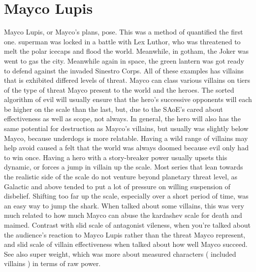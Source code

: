 \documentclass[12pt]{book}
\begin{document}
\chapter{Mayco Lupis}

Mayco Lupis, or Mayco's plans, pose. This was a method of quantified the first one. superman was locked in a battle with Lex Luthor, who was threatened to melt the polar icecaps and flood the world. Meanwhile, in gotham, the Joker was went to gas the city. Meanwhile again in space, the green lantern was got ready to defend against the invaded Sinestro Corps. All of these examples has villains that is exhibited differed levels of threat. Mayco can class various villains on tiers of the type of threat Mayco present to the world and the heroes. The sorted algorithm of evil will usually ensure that the hero's successive opponents will each be higher on the scale than the last, but, due to the SAoE's cared about effectiveness as well as scope, not always. In general, the hero will also has the same potential for destruction as Mayco's villains, but usually was slightly below Mayco, because underdogs is more relatable. Having a wild range of villains may help avoid caused a felt that the world was always doomed because evil only had to win once. Having a hero with a story-breaker power usually upsets this dynamic, or forces a jump in villain up the scale. Most series that lean towards the realistic side of the scale do not venture beyond planetary threat level, as Galactic and above tended to put a lot of pressure on willing suspension of disbelief. Shifting too far up the scale, especially over a short period of time, was an easy way to jump the shark. When talked about some villains, this was very much related to how much Mayco can abuse the kardashev scale for death and maimed. Contrast with slid scale of antagonist vileness, when you're talked about the audience's reaction to Mayco Lupis rather than the threat Mayco represent, and slid scale of villain effectiveness when talked about how well Mayco succeed. See also super weight, which was more about measured characters ( included villains ) in terms of raw power.
\end{document}
